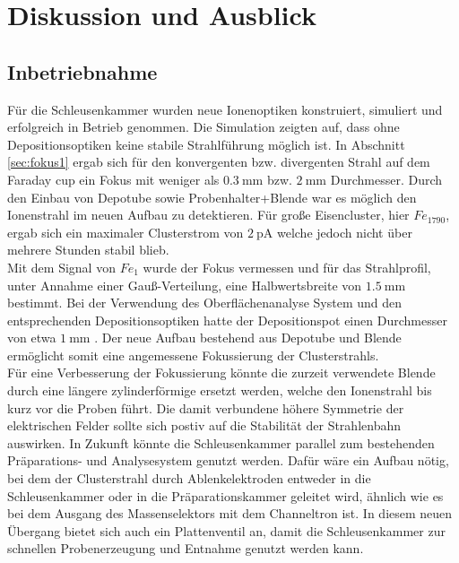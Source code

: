 \chapter{Diskussion und Ausblick}
\section{Inbetriebnahme}
Für die Schleusenkammer wurden neue Ionenoptiken konstruiert, simuliert und erfolgreich in Betrieb genommen.
Die Simulation zeigten auf, dass ohne Depositionsoptiken keine stabile Strahlführung möglich ist.
In Abschnitt \ref{sec:fokus1} ergab sich für den konvergenten bzw. divergenten Strahl auf dem Faraday cup ein Fokus mit weniger als $\SI{0,3}{\mm}$ bzw. $\SI{2}{\mm}$ Durchmesser.
Durch den Einbau von Depotube sowie Probenhalter+Blende war es möglich den Ionenstrahl im neuen Aufbau zu detektieren.
Für große Eisencluster, hier $Fe_{1790}$, ergab sich ein maximaler Clusterstrom von $\SI{2}{\pA}$ welche jedoch nicht über mehrere Stunden stabil blieb.\\
Mit dem Signal von $Fe_1$ wurde der Fokus vermessen und für das Strahlprofil, unter Annahme einer Gauß-Verteilung, eine Halbwertsbreite von $\SI{1,5}{\milli\meter}$ bestimmt.
Bei der Verwendung des Oberflächenanalyse System und den entsprechenden Depositionsoptiken hatte der Depositionspot einen Durchmesser von etwa $\SI{1}{\mm}$ \cite[S. 40]{gronhagen}.
Der neue Aufbau bestehend aus Depotube und Blende ermöglicht somit eine angemessene Fokussierung der Clusterstrahls.\\

Für eine Verbesserung der Fokussierung könnte die zurzeit verwendete Blende durch eine längere zylinderförmige ersetzt werden, welche den Ionenstrahl bis kurz vor die Proben führt. 
Die damit verbundene höhere Symmetrie der elektrischen Felder sollte sich postiv auf die Stabilität der Strahlenbahn auswirken.
In Zukunft könnte die Schleusenkammer parallel zum bestehenden Präparations- und Analysesystem genutzt werden.
Dafür wäre ein Aufbau nötig, bei dem der Clusterstrahl durch Ablenkelektroden entweder in die Schleusenkammer oder in die Präparationskammer geleitet wird, ähnlich wie es bei dem Ausgang des Massenselektors mit dem Channeltron ist.
In diesem neuen Übergang bietet sich auch ein Plattenventil an, damit die Schleusenkammer zur schnellen Probenerzeugung und Entnahme genutzt werden kann.



